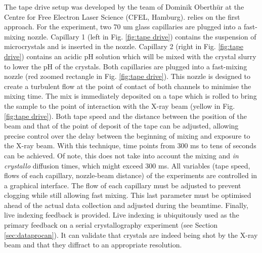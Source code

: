 The tape drive setup was developed by the team of Dominik Oberthür at the Centre for Free Electron Laser Science (CFEL, Hamburg). \parencite{beyerleinMixanddiffuseSerialSynchrotron2017,zielinskiRapidEfficientRoomtemperature2022} relies on the first approach. For the experiment, two 70 um glass capillaries are plugged into a fast-mixing nozzle. Capillary 1 (left in Fig. \ref{fig:tape drive}) contains the suspension of microcrystals and is inserted in the nozzle. Capillary 2 (right in Fig. \ref{fig:tape drive}) contains an acidic pH solution which will be mixed with the crystal slurry to lower the pH of the crystals. Both capillaries are plugged into a fast-mixing nozzle (red zoomed rectangle in Fig. \ref{fig:tape drive}). This nozzle is designed to create a turbulent flow at the point of contact of both channels to minimise the mixing time. The mix is immediately deposited on a tape which is rolled to bring the sample to the point of interaction with the X-ray beam (yellow in Fig. \ref{fig:tape drive}). Both tape speed and the distance between the position of the beam and that of the point of deposit of the tape can be adjusted, allowing precise control over the delay between the beginning of mixing and exposure to the X-ray beam. With this technique, time points from 300 ms to tens of seconds can be achieved. Of note, this does not take into account the mixing and \textit{in crystallo} diffusion times, which might exceed 300 ms. 
All variables (tape speed, flows of each capillary, nozzle-beam distance) of the experiments are controlled in a graphical interface. The flow of each capillary must be adjusted to prevent clogging while still allowing fast mixing. This last parameter must be optimised ahead of the actual data collection and adjusted during the beamtime. 
Finally, live indexing feedback is provided. Live indexing is ubiquitously used as the primary feedback on a serial crystallography experiment (see Section \ref{sec:dataprocan}). It can validate that crystals are indeed being shot by the X-ray beam and that they diffract to an appropriate resolution. 

